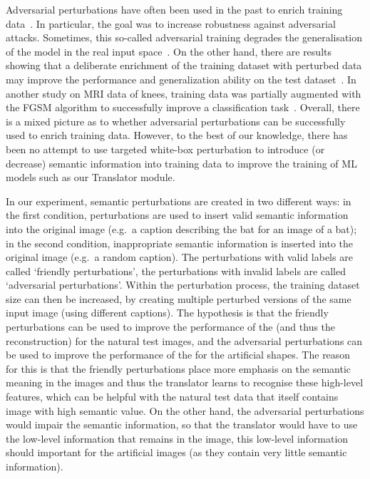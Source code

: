 Adversarial perturbations have often been used in the past to enrich training data~\cite{goodfellowExplainingHarnessingAdversarial2014,madryDeepLearningModels2019}. In particular, the goal was to increase robustness against adversarial attacks. Sometimes, this so-called adversarial training degrades the generalisation of the model in the real input space~\cite{kurakinAdversarialMachineLearning2017}. On the other hand, there are results showing that a deliberate enrichment of the training dataset with perturbed data may improve the performance and generalization ability on the test dataset~\cite{xieAdversarialExamplesImprove2020}.  In another study on MRI data of knees, training data was partially augmented with the FGSM algorithm to successfully improve a classification task~\cite{yanEnhancingClassificationPerformance2023}. Overall, there is a mixed picture as to whether adversarial perturbations can be successfully used to enrich training data. However, to the best of our knowledge, there has been no attempt to use targeted white-box perturbation to introduce (or decrease) semantic information into training data to improve the training of ML models such as our Translator module. 


In our experiment, semantic perturbations are created in two different ways: in the first condition, perturbations are used to insert valid semantic information into the original image (e.g.\ a caption describing the bat for an image of a bat); in the second condition, inappropriate semantic information is inserted into the original image (e.g.\ a random caption). The perturbations with valid labels are called `friendly perturbations', the perturbations with invalid labels are called `adversarial perturbations'. Within the perturbation process, the training dataset size can then be increased, by creating multiple perturbed versions of the same input image (using different captions). The  hypothesis is that the friendly perturbations can be used to improve the performance of the  (and thus the reconstruction) for the natural test images, and the adversarial perturbations can be used to improve the performance of the  for the artificial shapes. The reason for this is that the friendly perturbations place more emphasis on the semantic meaning in the images and thus the translator learns to recognise these high-level features, which can be helpful with the natural test data that itself contains image with high semantic value. On the other hand, the adversarial perturbations would impair the semantic information, so that the translator would have to use the low-level information that remains in the image, this low-level information should important for the artificial images (as they contain very little semantic information).


